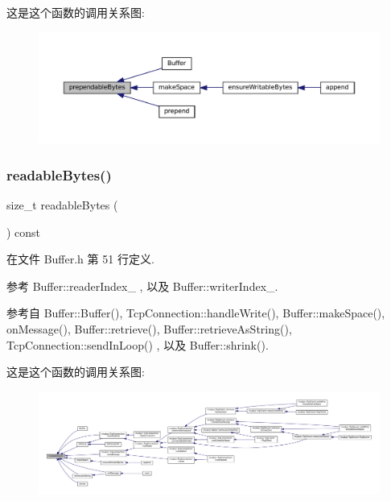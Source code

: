 这是这个函数的调用关系图\+:
\nopagebreak
\begin{figure}[H]
\begin{center}
\leavevmode
\includegraphics[width=350pt]{classmuduo_1_1Buffer_ad738bbd8321f518ca5cdfac842993d04_icgraph}
\end{center}
\end{figure}
\mbox{\label{classmuduo_1_1Buffer_afba1d23196411daa43950fdbbff6d724}} 
\subsubsection{\texorpdfstring{readable\+Bytes()}{readableBytes()}}
{\footnotesize\ttfamily size\+\_\+t readable\+Bytes (\begin{DoxyParamCaption}{ }\end{DoxyParamCaption}) const\hspace{0.3cm}{\ttfamily [inline]}}



在文件 Buffer.\+h 第 51 行定义.



参考 Buffer\+::reader\+Index\+\_\+ , 以及 Buffer\+::writer\+Index\+\_\+.



参考自 Buffer\+::\+Buffer(), Tcp\+Connection\+::handle\+Write(), Buffer\+::make\+Space(), on\+Message(), Buffer\+::retrieve(), Buffer\+::retrieve\+As\+String(), Tcp\+Connection\+::send\+In\+Loop() , 以及 Buffer\+::shrink().

这是这个函数的调用关系图\+:
\nopagebreak
\begin{figure}[H]
\begin{center}
\leavevmode
\includegraphics[width=350pt]{classmuduo_1_1Buffer_afba1d23196411daa43950fdbbff6d724_icgraph}
\end{center}
\end{figure}
\mbox{\label{classmuduo_1_1Buffer_abf4ee68d9e5290cdfb7f3854387f0576}} 
